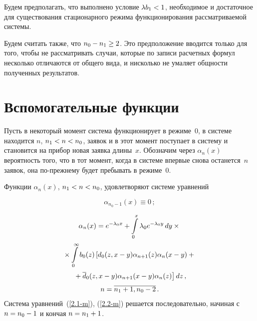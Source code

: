 \begin{multicols}{2}
Будем предполагать, что выполнено условие $\lambda b_1\hm<1$,
необходимое и достаточное для существования
стационарного режима функционирования рассматриваемой
системы.

Будем считать также, что $n_0\hm-n_1\hm\ge 2$.
Это предположение вводится только для того, чтобы не
рассматривать случаи, которые по записи расчетных
формул несколько отличаются от общего вида, и нисколько
не умаляет общности полученных результатов.

\section{Вспомогательные функции}

Пусть в некоторый момент система функционирует
в режиме~0, в системе находится $n$, $n_1\hm<n\hm<n_0$,
заявок и в этот момент поступает в сис\-те\-му и становится
на прибор новая заявка длины~$x$.
Обозначим через $\alpha_n(x)$ вероятность того, что в тот
момент, когда в системе впервые снова останется~$n$
заявок, она по-преж\-не\-му будет пребывать в режиме~0.


Функции $\alpha_n(x)$, $n_1\hm<n\hm<n_0$, удовлетворяют системе
уравнений

\columnbreak

\noindent
\begin{equation}
\label{2.1-m}
\alpha_{n_0-1}(x) \equiv 0\,;                    
\end{equation}

\vspace*{-12pt}

\noindent
\begin{multline}
\label{2.2-m}
\alpha_{n}(x)
= e^{-\lambda_0 x} 
+\int\limits_0^x \lambda_0 e^{-\lambda_0 y}\,dy\times{}\\[2pt]
{}\times
\int\limits_0^\infty b_0(z) \left[
d_0(z,x-y) \alpha_{n+1}(z) \alpha_{n}(x-y) + {}\right.\\[2pt]
\left.{}+ \d_0(z,x-y) \alpha_{n+1}(x-y) \alpha_{n}(z)
\right]  dz\,,\\[4pt]
n=\overline{n_1+1,n_0-2}\,.            %
\end{multline}
Система уравнений~(\ref{2.1-m}), (\ref{2.2-m}) решается
последовательно, начиная с $n\hm=n_0\hm-1$ и кончая $n\hm=n_1+1$.


\end{multicols}
